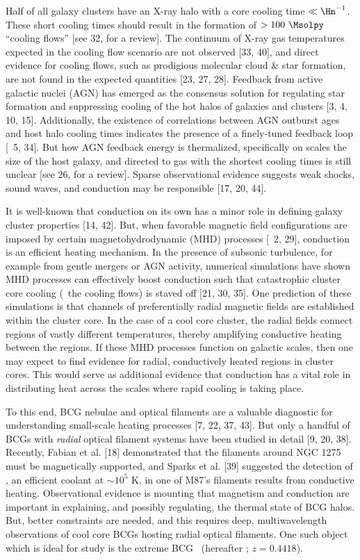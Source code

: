 \documentclass[12pt]{article}
\begin{document}
\justification

Half of all galaxy clusters have an X-ray halo with a core cooling
time $\ll \Hn^{-1}$. These short cooling times should result in the
formation of $> 100 ~\Msolpy$ ``cooling flows'' [see 32, for a
  review]. The continuum of X-ray gas temperatures expected in the
cooling flow scenario are not observed [33, 40], and direct evidence
for cooling flows, such as prodigious molecular cloud \& star
formation, are not found in the expected quantities [23, 27, 28].
Feedback from active galactic nuclei (AGN) has emerged as the
consensus solution for regulating star formation and suppressing
cooling of the hot halos of galaxies and clusters [3, 4, 10, 15].
Additionally, the existence of correlations between AGN outburst ages
and host halo cooling times indicates the presence of a finely-tuned
feedback loop [\ie\ 5, 34]. But how AGN feedback energy is
thermalized, specifically on scales the size of the host galaxy, and
directed to gas with the shortest cooling times is still unclear [see
  26, for a review]. Sparse observational evidence suggests weak
shocks, sound waves, and conduction may be responsible [17, 20, 44].

It is well-known that conduction on its own has a minor role in
defining galaxy cluster properties [14, 42]. But, when favorable
magnetic field configurations are imposed by certain
magnetohydrodynamic (MHD) processes [\eg\ 2, 29], conduction is an
efficient heating mechanism. In the presence of subsonic turbulence,
for example from gentle mergers or AGN activity, numerical simulations
have shown MHD processes can effectively boost conduction such that
catastrophic cluster core cooling (\ie\ the cooling flows) is staved
off [21, 30, 35]. One prediction of these simulations is that channels
of preferentially radial magnetic fields are established within the
cluster core. In the case of a cool core cluster, the radial fields
connect regions of vastly different temperatures, thereby amplifying
conductive heating between the regions. If these MHD processes
function on galactic scales, then one may expect to find evidence for
radial, conductively heated regions in cluster cores. This would serve
as additional evidence that conduction has a vital role in
distributing heat across the scales where rapid cooling is taking
place.

To this end, BCG nebulae and optical filaments are a valuable
diagnostic for understanding small-scale heating processes [7, 22, 37,
  43]. But only a handful of BCGs with {\it{radial}} optical filament
systems have been studied in detail [9, 20, 38]. Recently, Fabian et
al. [18] demonstrated that the filaments around NGC 1275 must be
magnetically supported, and Sparks et al. [39] suggested the detection
of \civ, an efficient coolant at $\sim 10^{5}$ K, in one of M87's
filaments results from conductive heating. Observational evidence is
mounting that magnetism and conduction are important in explaining,
and possibly regulating, the thermal state of BCG halos. But, better
constraints are needed, and this requires deep, multiwavelength
observations of cool core BCGs hosting radial optical filaments. One
such object which is ideal for study is the extreme BCG
\iras\ (hereafter \irs; $z=0.4418$).
\end{document}
